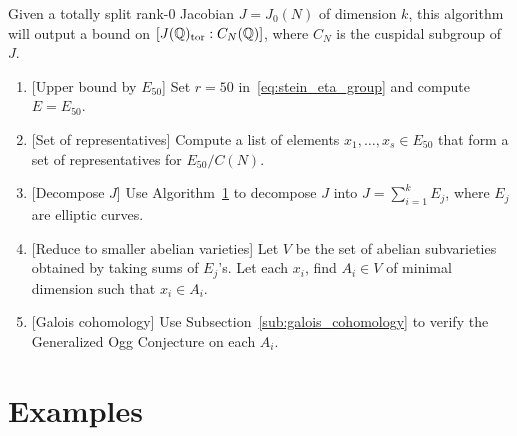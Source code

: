 \begin{algorithm}%
    \label{alg:final_bouind}
    Given a totally split rank-0 Jacobian $J=J_0(N)$ of dimension $k$, this
    algorithm will output a bound on $[J(\mathbb{Q})_{\mathrm{tor}}:C_N(\mathbb{Q})]$, where $C_N$ is
    the cuspidal subgroup of $J$.
    \begin{enumerate}
        \item{} [Upper bound by $E_{50}$]
            Set $r=50$ in~\eqref{eq:stein_eta_group} and compute $E=E_{50}$.
        \item{} [Set of representatives]
            Compute a list of elements $x_1,\ldots,x_s\in E_{50}$ that form a
            set of representatives for $E_{50}/C(N)$.
        \item{} [Decompose $J$]
            Use Algorithm~\ref{} to decompose $J$ into $J=\sum_{i=1} ^k E_j$,
            where $E_j$ are elliptic curves. 
        \item{} [Reduce to smaller abelian varieties]
            Let $V$ be the set of abelian subvarieties obtained by taking sums
            of $E_j$'s. Let each $x_i$, find $A_i\in V$ of minimal dimension
            such that $x_i\in A_i$.
        \item{} [Galois cohomology]
            Use Subsection~\ref{sub:galois_cohomology} to verify the
            Generalized Ogg Conjecture on each $A_i$.
    \end{enumerate}
\end{algorithm}

\section{Examples}

